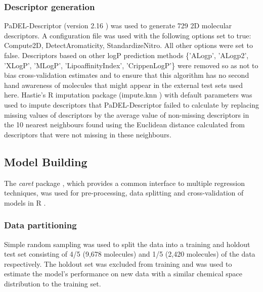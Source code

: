 \documentclass[10pt]{bmc_article}
\newenvironment{bmcformat}{\begin{raggedright}\baselineskip20pt\sloppy\setboolean{publ}{false}}{\end{raggedright}\baselineskip20pt\sloppy}
\begin{document}
\begin{bmcformat}
\subsubsection*{Descriptor generation} 
PaDEL-Descriptor (version 2.16 ) \cite{yap_padel-descriptor:_2011} was used to generate 729 2D molecular descriptors. A configuration file was used with the following options set to true: Compute2D, DetectAromaticity, StandardizeNitro. All other options were set to false. Descriptors based on other logP prediction methods \{'ALogp', 'ALogp2', 'XLogP', 'MLogP', 'LipoaffinityIndex', 'CrippenLogP'\} were removed so as not to bias cross-validation estimates and to ensure that this algorithm has no second hand awareness of molecules that might appear in the external test sets used here. Hastie's R imputation package (impute.knn \cite{_imputing_????}) with default parameters was used to impute descriptors that PaDEL-Descriptor failed to calculate by replacing missing values of descriptors by the average value of non-missing descriptors in the 10 nearest neighbours found using the Euclidean distance calculated from descriptors that were not missing in these neighbours.

\subsection*{Model Building}
The \textit{caret} package \cite{Kuhn2008}, which provides a common interface to multiple regression techniques, was used for pre-processing, data splitting and cross-validation of models in R \cite{R}. 

\subsubsection*{Data partitioning}
Simple random sampling was used to split the data into a training and holdout test set consisting of 4/5 (9,678 molecules) and 1/5 (2,420 molecules) of the data respectively. The holdout set was excluded from training and was used to estimate the model's performance on new data with a similar chemical space distribution to the training set. 


\end{bmcformat}
\end{document}
